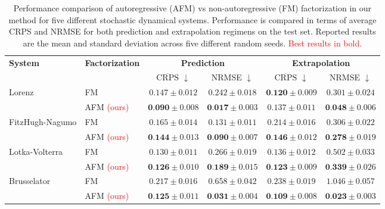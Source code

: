 \documentclass[a4paper,10pt,twocolumn,preprint,3p]{elsarticle}
\begin{document}
\begin{table}[!ht]
    \centering
    \caption{Performance comparison of autoregressive (AFM) vs non-autoregressive (FM) factorization in our method for five different stochastic dynamical systems. Performance is compared in terms of average CRPS and NRMSE for both prediction and extrapolation regimens on the test set.
    Reported results are the mean and standard deviation across five different random seeds. \textcolor{red}{Best results in bold.}}
    \renewcommand{\arraystretch}{1.2}
    \setlength{\tabcolsep}{6pt}
    \begin{small}
    \begin{tabular}{l l cc cc}
        \toprule
        \multirow{2}{*}{\textbf{System}} & \multirow{2}{*}{\textbf{Factorization}} & 
        \multicolumn{2}{c}{\textbf{Prediction}} & \multicolumn{2}{c}{\textbf{Extrapolation}} \\
        \cmidrule(lr){3-4} \cmidrule(lr){5-6}
        & & $\overline{\text{CRPS}}$ \(\downarrow\) & NRMSE \(\downarrow\) & $\overline{\text{CRPS}}$ \(\downarrow\) & NRMSE \(\downarrow\) \\
        \midrule
        \multirow{2}{*}{Lorenz} 
            & FM   & $0.147 \pm 0.012$ & $0.242 \pm 0.018$ & $\textbf{0.120} \pm 0.009$ & $0.301 \pm 0.024$ \\
            & AFM \textcolor{red}{(ours)} & $\textbf{0.090} \pm 0.008$ & $\textbf{0.017} \pm 0.003$ & $0.137 \pm 0.011$ & $\textbf{0.048} \pm 0.006$ \\
        \midrule
        \multirow{2}{*}{FitzHugh-Nagumo} 
            & FM  & $0.165 \pm 0.014$ & $0.131 \pm 0.011$ &  $0.214 \pm 0.016$ & $0.306 \pm 0.022$ \\
            & AFM \textcolor{red}{(ours)} & $\textbf{0.144} \pm 0.013$ & $\textbf{0.090} \pm 0.007$ & $\textbf{0.146} \pm 0.012$ & $\textbf{0.278} \pm 0.019$ \\
        \midrule
        \multirow{2}{*}{Lotka-Volterra} 
            & FM  & $0.130 \pm 0.011$ & $0.266 \pm 0.019$ & $0.136 \pm 0.012$ & $0.502 \pm 0.033$ \\
            & AFM \textcolor{red}{(ours)} & $\textbf{0.126} \pm 0.010$ & $\textbf{0.189} \pm 0.015$ & $\textbf{0.123} \pm 0.009$ & $\textbf{0.339} \pm 0.026$ \\
        \midrule
        \multirow{2}{*}{Brusselator} 
            & FM  & $0.217 \pm 0.016$ & $0.658 \pm 0.042$ & $0.238 \pm 0.019$ & $1.046 \pm 0.057$ \\
            & AFM \textcolor{red}{(ours)} & $\textbf{0.125} \pm 0.011$ & $\textbf{0.031} \pm 0.004$ & $\textbf{0.109} \pm 0.008$ & $\textbf{0.023} \pm 0.003$ \\

\end{tabular}
\end{small}
\end{table}
\end{document}
